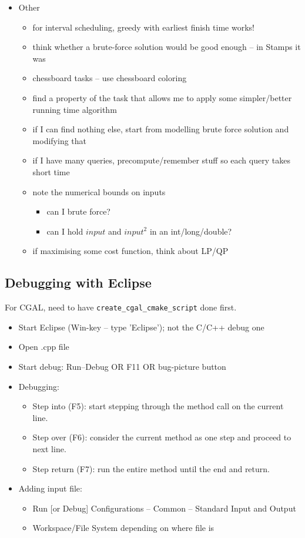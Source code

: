 \documentclass[a4paper,titlepage]{article}
\begin{document}
\begin{itemize}
\begin{itemize}
    \end{itemize}
  \item Other
    \begin{itemize}
    \item for interval scheduling, greedy with earliest finish time works!
    \item think whether a brute-force solution would be good enough -- in Stamps it was
    \item chessboard tasks -- use chessboard coloring
    \item find a property of the task that allows me to apply some simpler/better running time algorithm
    \item if I can find nothing else, start from modelling brute force solution and modifying that
    \item if I have many queries, precompute/remember stuff so each query takes short time
    \item note the numerical bounds on inputs
      \begin{itemize}
      \item can I brute force?
      \item can I hold $input$ and $input^2$ in an int/long/double?
      \end{itemize}
    \item if maximising some cost function, think about LP/QP
    \end{itemize}
\end{itemize}

\subsection{Debugging with Eclipse}
For CGAL, need to have \verb+create_cgal_cmake_script+ done first.
\begin{itemize}
\item Start Eclipse (Win-key -- type 'Eclipse'); not the C/C++ debug one
\item Open .cpp file
\item Start debug: Run--Debug OR F11 OR bug-picture button
\item Debugging:
\begin{itemize}
  \item Step into (F5): start stepping through the method call on the current line.
  \item Step over (F6): consider the current method as one step and proceed to next line.
  \item Step return (F7): run the entire method until the end and return.
\end{itemize}
\item Adding input file:
\begin{itemize}
  \item Run [or Debug] Configurations -- Common -- Standard Input and Output
  \item Workspace/File System depending on where file is
\end{itemize}
\end{itemize}
\end{document}
